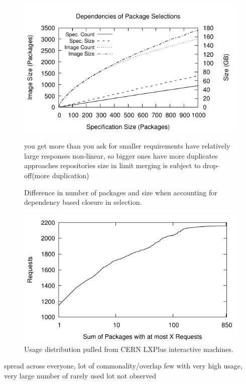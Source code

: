 \documentclass[sigconf]{acmart}
\begin{document}
\begin{figure}
\includegraphics[width=\linewidth]{curated/closure/closure.pdf}
\caption{Difference in number of packages and size when accounting for dependency based closure in selection.}
\label{fig:picks}
you get more than you ask for
smaller requirements have relatively large responses
non-linear, so bigger ones have more duplicates
approaches repositories size in limit
merging is subject to drop-off(more duplication)
\fi
\end{figure}

\begin{figure}
    \includegraphics[width=\linewidth]{curated/lxplus_dist/usage_distribution_cdf.pdf}
    \caption{Usage distribution pulled from CERN LXPlus interactive machines.}
    \label{fig:usage_distribution}
\end{figure}

spread across everyone, lot of commonality/overlap
few with very high usage, very large number of rarely used
lot not observed
\fi
\end{document}
